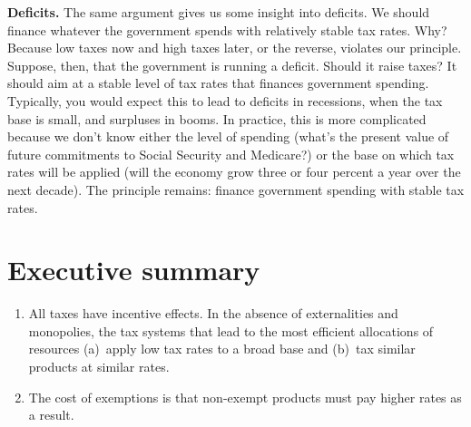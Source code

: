 \textbf{Deficits.} The same argument gives us some insight into deficits. We should finance whatever the government spends
with relatively stable tax rates.
Why?  Because low taxes now and high taxes later, or the reverse,
violates our principle.
Suppose, then, that the government is running a deficit.
Should it raise taxes?
It should aim at a stable level of tax rates
that finances government spending.
Typically, you would expect this to lead to deficits in recessions,
when the tax base is small, and surpluses in booms.
In practice, this is more complicated because we don't know either the level
of spending (what's the present value of future commitments to
Social Security and Medicare?)
or the base on which tax rates will be applied
(will the economy grow three or four percent a year over the next decade).
The principle remains:
finance government spending with stable tax rates.

\begin{comment}
{\it Tax arbitrage.}
Differences in tax rates lead to obvious incentives to relabel
a high-tax item as a low-tax item.
In the UK, taxes are more favorable to capital expenditures
on equipment than structures
(equipment is expensed, structures are amortized),
so there's an incentive for firms to interpret equipment broadly.
In Ireland, the corporate tax rate is very low,
so multinational firms have an incentive to shift profits from
(say) the US to Ireland.
(How might they do this?)
In the US, corporate taxes place a cap on the deductability of
executive salaries, but not on other forms of compensation (stock options,
for example), which creates an incentive for firms to pay executives
through the latter.
\end{comment}


\section*{Executive summary}

\setlength{\leftmargini}{.5\oldleftmargini}
\begin{enumerate}

\item All taxes have incentive effects.  In the absence of externalities and monopolies, the tax
systems that lead to the most efficient allocations of resources
(a)~apply low tax rates to a broad base
and (b)~tax similar products at similar rates.

\item The cost of exemptions is that non-exempt products must pay higher rates as a result.

\end{enumerate}
\setlength{\leftmargini}{\oldleftmargini}


